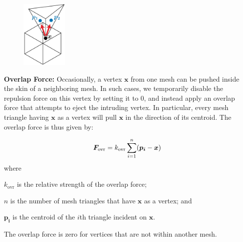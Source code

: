
\bigskip

\begin{figure}
\vspace{-15pt}
\centering
    \includegraphics[width=0.2\textwidth]{figures/repulsionpak/overlap_forces.pdf}
\end{figure}
\textbf{Overlap Force:}
Occasionally, a vertex $\bm{x}$ from one mesh can be pushed inside the skin of a
neighboring mesh.  In such cases, we temporarily disable the repulsion force
on this vertex
by setting it to 0, and instead apply an overlap force that attempts to
eject the intruding vertex.  In particular, every mesh triangle having $\bm{x}$
as a vertex will pull $\bm{x}$ in the direction of its centroid.  The overlap
force is thus given by:

\begin{equation}
\bm{F}_\mathrm{ovr} = k_\mathrm{ovr} \sum_{i = 1}^{n} (\bm{p_{i}} - \bm{x})
\end{equation}
where
\begin{packeddescriptions}
	\item[$k_\mathrm{ovr}$] is the relative strength of the overlap force;
	\item[$n$] is the number of mesh triangles that have $\bm{x}$ as a vertex; and
	\item[$\bm{p_{i}}$] is the centroid of the $i$th triangle incident on $\bm{x}$.
\end{packeddescriptions}

The overlap force is zero for vertices that are not within another mesh.

\bigskip

